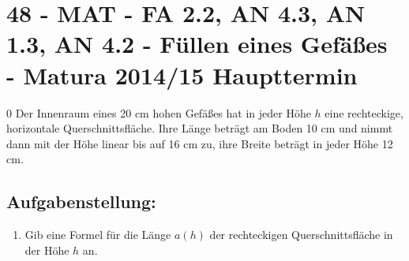 \section{48 - MAT - FA 2.2, AN 4.3, AN 1.3, AN 4.2 - Füllen eines Gefäßes - Matura 2014/15 Haupttermin}

\begin{langesbeispiel} \item[0] %
				Der Innenraum eines 20 cm hohen Gefäßes hat in jeder Höhe $h$ eine rechteckige, horizontale Querschnittsfläche. Ihre Länge beträgt am Boden 10 cm und nimmt dann mit der Höhe linear bis auf 16 cm zu, ihre Breite beträgt in jeder Höhe 12 cm.
				
				\begin{center}
				\end{center}


\subsection{Aufgabenstellung:}
\begin{enumerate}
	\item {} Gib eine Formel für die Länge $a(h)$ der rechteckigen Querschnittsfläche in der Höhe $h$ an.
	

\end{enumerate}
\end{langesbeispiel}
